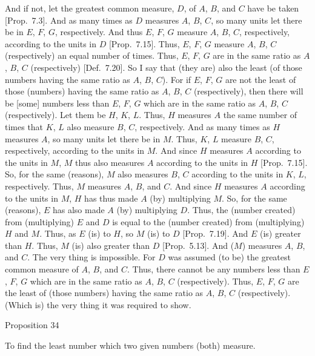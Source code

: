 And if not, let the greatest common measure, $D$, of $A$, $B$, and $C$ have be taken
[Prop.~7.3]. And as many times as $D$
measures $A$, $B$,  $C$, so many units let there be in 
$E$, $F$, $G$, respectively. And thus  $E$, $F$, $G$ measure 
$A$, $B$, $C$, respectively, according to the units in $D$ [Prop.~7.15]. Thus, $E$, $F$, $G$ measure
$A$, $B$, $C$ (respectively) an equal number of times. Thus, $E$, $F$,  $G$
are in the same ratio as $A$, $B$, $C$ (respectively) [Def.~7.20]. So I say that (they
are) also the least (of those numbers having the same ratio as $A$, $B$, $C$).
For if $E$, $F$,  $G$ are not the least of those (numbers) having the same ratio
as $A$, $B$,  $C$ (respectively), then there will be [some] numbers less than $E$, $F$,  $G$
which are in the same ratio as $A$, $B$, $C$ (respectively). Let them be $H$, $K$,  $L$.
Thus, $H$ measures $A$ the same number of times that 
$K$,  $L$ also measure $B$,  $C$, respectively. And as many
times as $H$ measures $A$, so many units let there be in $M$. Thus,  $K$, $L$
measure $B$, $C$, respectively, according to the units in $M$.
And since $H$ measures $A$ according to the units in $M$, $M$ thus also measures
$A$ according to the units in $H$ [Prop.~7.15].
So, for the same (reasons), $M$ also measures  $B$, $C$ according to
the units in  $K$, $L$, respectively. Thus, $M$ measures $A$, $B$, and $C$. And since
$H$ measures $A$ according to the units in $M$, $H$ has thus made $A$ (by)
multiplying $M$. So, for the same (reasons), $E$ has also made $A$ (by)
multiplying $D$. Thus, the (number created) from (multiplying) $E$ and $D$
is equal to the (number created) from (multiplying) $H$ and $M$. 
Thus, as $E$ (is) to $H$, so $M$ (is) to $D$ [Prop.~7.19]. And $E$ (is) greater than $H$. Thus,
$M$ (is) also greater than $D$ [Prop.~5.13].
And ($M$) measures $A$, $B$, and $C$.  The very thing is impossible.
For $D$ was assumed (to be) the greatest common measure of $A$, $B$, and $C$. 
Thus, there cannot be any numbers less than $E$, $F$, $G$ which are
in the same ratio as $A$, $B$,  $C$ (respectively). Thus, $E$, $F$,  $G$ are the
least of (those numbers) having the same ratio as $A$, $B$,  $C$ (respectively).
(Which is) the very thing it was required to show.


\begin{center}
{\large Proposition 34}
\end{center}

To find the least
number which two given numbers  (both) measure.

